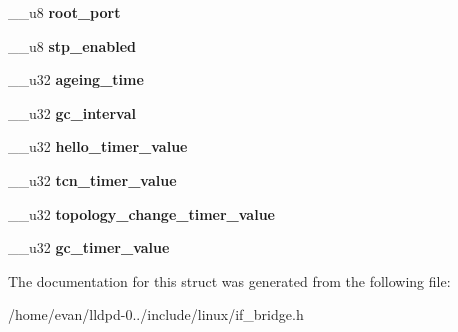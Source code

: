 \begin{DoxyCompactItemize}
\item 
\-\_\-\-\_\-u8 {\bfseries root\-\_\-port}\label{struct____bridge__info_a586599c182211d70b2b91ddf320d6848}

\item 
\-\_\-\-\_\-u8 {\bfseries stp\-\_\-enabled}\label{struct____bridge__info_a2c5a1b603a391db3849cbce191cd120a}

\item 
\-\_\-\-\_\-u32 {\bfseries ageing\-\_\-time}\label{struct____bridge__info_a08816dca3925eeedb7a5bfa0e4455ca3}

\item 
\-\_\-\-\_\-u32 {\bfseries gc\-\_\-interval}\label{struct____bridge__info_a277a042cef3200ea3757fa760ba61833}

\item 
\-\_\-\-\_\-u32 {\bfseries hello\-\_\-timer\-\_\-value}\label{struct____bridge__info_a07412c98f1c59ccf6ec79e80656d26c8}

\item 
\-\_\-\-\_\-u32 {\bfseries tcn\-\_\-timer\-\_\-value}\label{struct____bridge__info_a71b5e1b141047caad93e1cc38e1b493a}

\item 
\-\_\-\-\_\-u32 {\bfseries topology\-\_\-change\-\_\-timer\-\_\-value}\label{struct____bridge__info_af72df07cff3fd1ee461c4b680e4952a3}

\item 
\-\_\-\-\_\-u32 {\bfseries gc\-\_\-timer\-\_\-value}\label{struct____bridge__info_a3780711500ef86ca03e5fb0d0afabf8b}

\end{DoxyCompactItemize}


\-The documentation for this struct was generated from the following file\-:\begin{DoxyCompactItemize}
\item 
/home/evan/lldpd-\/0../include/linux/if\-\_\-bridge.\-h\end{DoxyCompactItemize}
